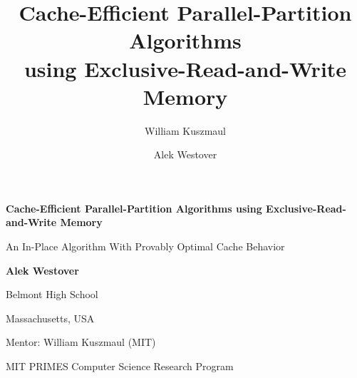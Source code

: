 \documentclass[11pt]{article}
\theoremstyle{remark}
\theoremstyle{remark}
\begin{document}
\title{Cache-Efficient Parallel-Partition Algorithms \\using Exclusive-Read-and-Write Memory}

\author{William Kuszmaul}


\author{Alek Westover}


\begin{titlepage}
    \begin{center}
        \vspace*{1cm}
 
        \Huge
        \textbf{Cache-Efficient Parallel-Partition Algorithms using Exclusive-Read-and-Write Memory}
 
        \vspace{0.5cm}
        \LARGE
				An In-Place Algorithm With Provably Optimal Cache Behavior
 
        \vspace{1.5cm}
				\vfill
 
        \textbf{Alek Westover}

        \vspace{1.5cm}
				Belmont High School

				Massachusetts, USA

        \vspace{1.5cm}
				Mentor: William Kuszmaul (MIT)
 
        \vspace{0.8cm}
				MIT PRIMES Computer Science Research Program
 
 
        \Large
 
    \end{center}
\end{titlepage}
\end{document}
